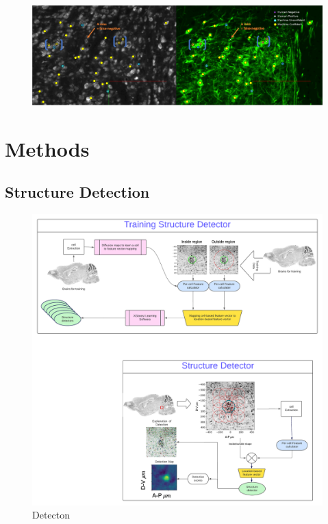 \documentclass[runningheads]{llncs}
\begin{document}
\begin{figure}[b]
  \includegraphics[width=\textwidth]{figures/Marked_cell_detections.png}
  \caption{}
\end{figure}

\newpage

\section{Methods}

\subsection{Structure Detection}

\iffalse
\begin{figure}[t]
  \includegraphics[width=\textwidth]{figures/detection.pdf}
  \caption{Detecton \label{fig:detection}}
\end{figure}
\end{document}
